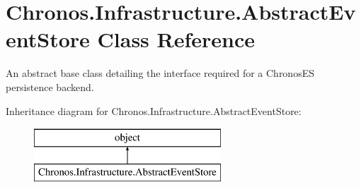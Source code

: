 \hypertarget{classChronos_1_1Infrastructure_1_1AbstractEventStore}{}\section{Chronos.\+Infrastructure.\+Abstract\+Event\+Store Class Reference}
\label{classChronos_1_1Infrastructure_1_1AbstractEventStore}


An abstract base class detailing the interface required for a Chronos\+ES persistence backend.  


Inheritance diagram for Chronos.\+Infrastructure.\+Abstract\+Event\+Store\+:\begin{figure}[H]
\begin{center}
\leavevmode
\includegraphics[height=2.000000cm]{classChronos_1_1Infrastructure_1_1AbstractEventStore}
\end{center}
\end{figure}
